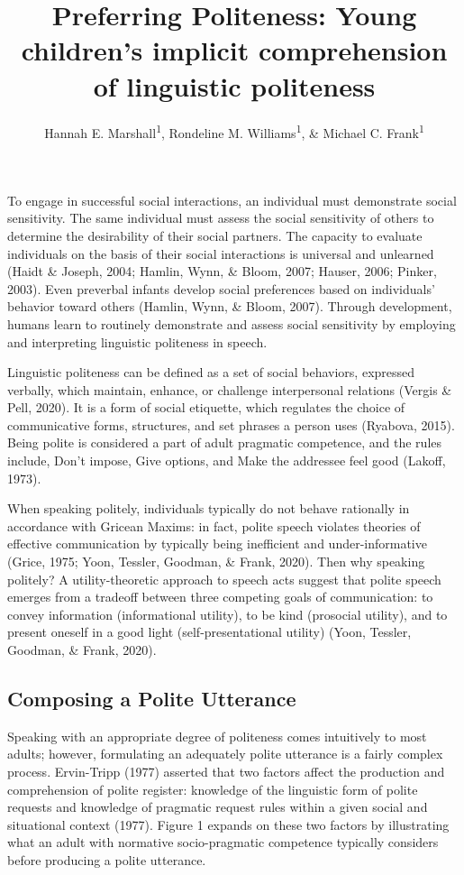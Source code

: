 \documentclass[
  english,
  man,floatsintext]{apa6}
\title{Preferring Politeness: Young children's implicit comprehension of linguistic politeness}
\author{Hannah E. Marshall\textsuperscript{1}, Rondeline M. Williams\textsuperscript{1}, \& Michael C. Frank\textsuperscript{1}}
\date{}
\affiliation{\vspace{0.5cm}\textsuperscript{1} Stanford University}
\begin{document}
\maketitle

To engage in successful social interactions, an individual must demonstrate social sensitivity. The same individual must assess the social sensitivity of others to determine the desirability of their social partners. The capacity to evaluate individuals on the basis of their social interactions is universal and unlearned (Haidt \& Joseph, 2004; Hamlin, Wynn, \& Bloom, 2007; Hauser, 2006; Pinker, 2003). Even preverbal infants develop social preferences based on individuals' behavior toward others (Hamlin, Wynn, \& Bloom, 2007). Through development, humans learn to routinely demonstrate and assess social sensitivity by employing and interpreting linguistic politeness in speech.

Linguistic politeness can be defined as a set of social behaviors, expressed verbally, which maintain, enhance, or challenge interpersonal relations (Vergis \& Pell, 2020). It is a form of social etiquette, which regulates the choice of communicative forms, structures, and set phrases a person uses (Ryabova, 2015). Being polite is considered a part of adult pragmatic competence, and the rules include, Don't impose, Give options, and Make the addressee feel good (Lakoff, 1973).

When speaking politely, individuals typically do not behave rationally in accordance with Gricean Maxims: in fact, polite speech violates theories of effective communication by typically being inefficient and under-informative (Grice, 1975; Yoon, Tessler, Goodman, \& Frank, 2020). Then why speaking politely? A utility-theoretic approach to speech acts suggest that polite speech emerges from a tradeoff between three competing goals of communication: to convey information (informational utility), to be kind (prosocial utility), and to present oneself in a good light (self-presentational utility) (Yoon, Tessler, Goodman, \& Frank, 2020).

\hypertarget{composing-a-polite-utterance}{%
\subsection{Composing a Polite Utterance}\label{composing-a-polite-utterance}}

Speaking with an appropriate degree of politeness comes intuitively to most adults; however, formulating an adequately polite utterance is a fairly complex process. Ervin-Tripp (1977) asserted that two factors affect the production and comprehension of polite register: knowledge of the linguistic form of polite requests and knowledge of pragmatic request rules within a given social and situational context (1977). Figure 1 expands on these two factors by illustrating what an adult with normative socio-pragmatic competence typically considers before producing a polite utterance.
\end{document}
